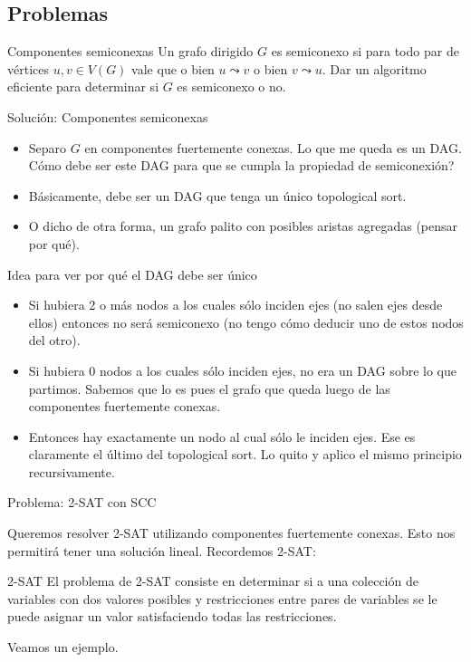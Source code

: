 \documentclass[compress]{beamer}
\newcommand{\bigpause}{\bigskip \pause}
\begin{document}
\subsection{Problemas}
\begin{frame}{Componentes semiconexas}
Un grafo dirigido $G$ es semiconexo si para todo par de vértices $u, v \in V(G)$
vale que o bien $u \leadsto v$ o bien $v \leadsto u$. Dar un algoritmo
eficiente para determinar si $G$ es semiconexo o no.
\end{frame}

\begin{frame}{Solución: Componentes semiconexas}
\begin{itemize}
\item Separo $G$ en componentes fuertemente conexas. Lo que me queda es un DAG.
\textquestiondown Cómo debe ser este DAG para que se cumpla la propiedad de
semiconexión?
\bigpause
\item  Básicamente, debe ser un DAG que tenga un único topological sort.
\bigpause
\item  O dicho de otra forma, un grafo palito con posibles aristas agregadas (pensar por qué).
\end{itemize}
\end{frame}

\begin{frame}{Idea para ver por qué el DAG debe ser único}
\begin{itemize}
\item Si hubiera 2 o más nodos a los cuales sólo inciden ejes (no salen
ejes desde ellos) entonces no será semiconexo (no tengo cómo deducir
uno de estos nodos del otro).
\item Si hubiera 0 nodos a los cuales sólo inciden ejes, no era un DAG
sobre lo que partimos. Sabemos que lo es pues el grafo que queda luego
de las componentes fuertemente conexas.
\item Entonces hay exactamente un nodo al cual sólo le inciden ejes. Ese 
es claramente el último del topological sort. Lo quito y aplico el mismo
principio recursivamente.
\end{itemize}
\end{frame}


\begin{frame}{Problema: 2-SAT con SCC}

Queremos resolver 2-SAT utilizando componentes fuertemente conexas.
Esto nos permitirá tener una solución lineal. Recordemos 2-SAT: \\

\bigskip

\begin{block}{2-SAT}
El problema de 2-SAT consiste en determinar si a una colección de 
variables con dos valores posibles y restricciones entre pares de 
variables se le puede asignar un valor satisfaciendo todas las 
restricciones.
\end{block}

\bigskip

Veamos un ejemplo.

\end{frame}
\end{document}
